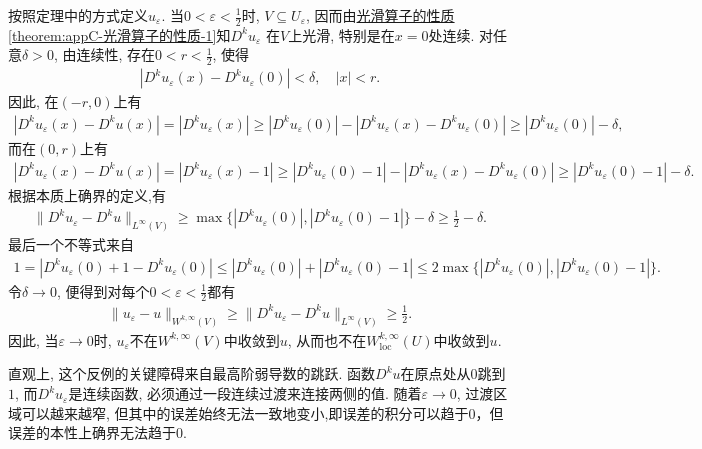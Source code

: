 \documentclass[../../main.tex]{subfiles}
\begin{document}
\begin{remark}
按照定理中的方式定义$u_\varepsilon$. 当$0<\varepsilon<\frac12$时, $V\subseteq U_\varepsilon$, 因而由\hyperref[theorem:appC-光滑算子的性质]{光滑算子的性质\ref{theorem:appC-光滑算子的性质-1}}知$D^ku_\varepsilon$
在$V$上光滑, 特别是在$x=0$处连续. 对任意$\delta>0$, 由连续性, 存在$0<r<\frac12$, 使得
\begin{align*}
|D^ku_\varepsilon(x)-D^ku_\varepsilon(0)|<\delta,\quad |x|<r.
\end{align*}
因此, 在$(-r,0)$上有
\begin{align*}
|D^ku_{\varepsilon}(x)-D^ku(x)|=|D^ku_{\varepsilon}(x)|\geqslant |D^ku_{\varepsilon}(0)|-|D^ku_{\varepsilon}(x)-D^ku_{\varepsilon}(0)|\geqslant |D^ku_{\varepsilon}(0)|-\delta ,
\end{align*}
而在$(0,r)$上有
\begin{align*}
|D^ku_{\varepsilon}(x)-D^ku(x)|=|D^ku_{\varepsilon}(x)-1|\geqslant |D^ku_{\varepsilon}(0)-1|-|D^ku_{\varepsilon}(x)-D^ku_{\varepsilon}(0)|\geqslant |D^ku_{\varepsilon}(0)-1|-\delta .
\end{align*}
根据本质上确界的定义,有
\begin{align*}
\|D^ku_\varepsilon-D^ku\|_{L^\infty(V)}
\geqslant\max\{|D^ku_\varepsilon(0)|,|D^ku_\varepsilon(0)-1|\}-\delta\geqslant\frac12-\delta.
\end{align*}
最后一个不等式来自
\begin{align*}
1=\left| D^ku_{\varepsilon}(0)+1-D^ku_{\varepsilon}(0) \right|\leqslant |D^ku_\varepsilon(0)|+|D^ku_\varepsilon(0)-1|
\leqslant 2\max\{|D^ku_\varepsilon(0)|,|D^ku_\varepsilon(0)-1|\}.
\end{align*}
令$\delta\to0$, 便得到对每个$0<\varepsilon<\frac12$都有
\begin{align*}
\|u_\varepsilon-u\|_{W^{k,\infty}(V)}
\geqslant\|D^ku_\varepsilon-D^ku\|_{L^\infty(V)}
\geqslant\frac12.
\end{align*}
因此, 当$\varepsilon\to0$时, $u_\varepsilon$不在$W^{k,\infty}(V)$中收敛到$u$, 从而也不在$W_{\mathrm{loc}}^{k,\infty}(U)$中收敛到$u$.

直观上, 这个反例的关键障碍来自最高阶弱导数的跳跃. 函数$D^ku$在原点处从$0$跳到$1$, 而$D^ku_\varepsilon$是连续函数, 必须通过一段连续过渡来连接两侧的值. 随着$\varepsilon\to0$, 过渡区域可以越来越窄, 但其中的误差始终无法一致地变小,即误差的积分可以趋于0，但误差的本性上确界无法趋于0.


\end{remark}
\end{document}
